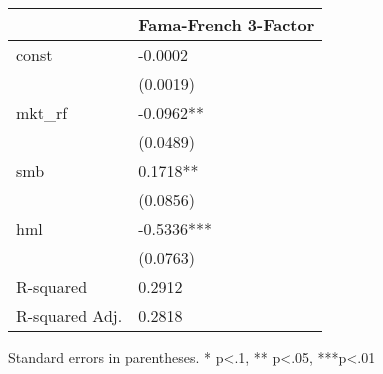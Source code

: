 \begin{table}
\caption{}
\label{}
\begin{center}
\begin{tabular}{ll}
\hline
               & Fama-French 3-Factor  \\
\hline
const          & -0.0002               \\
               & (0.0019)              \\
mkt\_rf        & -0.0962**             \\
               & (0.0489)              \\
smb            & 0.1718**              \\
               & (0.0856)              \\
hml            & -0.5336***            \\
               & (0.0763)              \\
R-squared      & 0.2912                \\
R-squared Adj. & 0.2818                \\
\hline
\end{tabular}
\end{center}
\end{table}
\bigskip
Standard errors in parentheses. \newline 
* p<.1, ** p<.05, ***p<.01